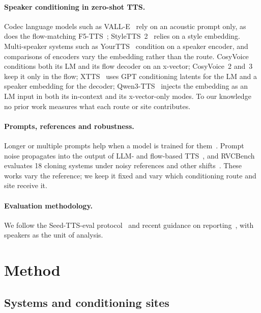 \documentclass[10pt]{article}
\begin{document}
\paragraph{Speaker conditioning in zero-shot TTS.}
Codec language models such as VALL-E~\citep{valle} rely on an acoustic prompt only, as does the flow-matching F5-TTS~\citep{f5tts}; StyleTTS~2~\citep{styletts2} relies on a style embedding.
Multi-speaker systems such as YourTTS~\citep{yourtts} condition on a speaker encoder, and comparisons of encoders vary the embedding rather than the route.
CosyVoice~\citep{cosyvoice} conditions both its LM and its flow decoder on an x-vector; CosyVoice~2 and~3~\citep{cosyvoice2,cosyvoice3} keep it only in the flow; XTTS~\citep{xtts} uses GPT conditioning latents for the LM and a speaker embedding for the decoder; Qwen3-TTS~\citep{qwen3tts} injects the embedding as an LM input in both its in-context and its x-vector-only modes.
To our knowledge no prior work measures what each route or site contributes.

\paragraph{Prompts, references and robustness.}
Longer or multiple prompts help when a model is trained for them~\citep{megatts2,lei2023multiscale,pfluxtts}.
Prompt noise propagates into the output of LLM- and flow-based TTS~\citep{lu2025noise,wang2024noise}, and RVCBench evaluates 18 cloning systems under noisy references and other shifts~\citep{rvcbench}.
These works vary the reference; we keep it fixed and vary which conditioning route and site receive it.

\paragraph{Evaluation methodology.}
We follow the Seed-TTS-eval protocol~\citep{seedtts} and recent guidance on reporting~\citep{kirkland2023mos,wester2015listeners}, with speakers as the unit of analysis.

\section{Method}
\label{sec:method}

\subsection{Systems and conditioning sites}
\end{document}

